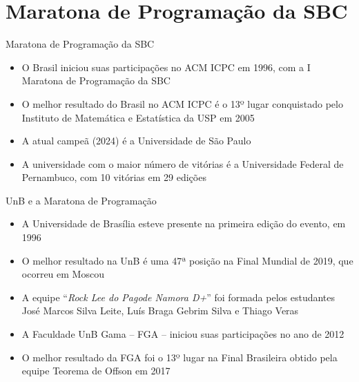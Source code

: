 \section{Maratona de Programação da SBC}

\begin{frame}[fragile]{Maratona de Programação da SBC}

    \begin{itemize}
        \item O Brasil iniciou suas participações no ACM ICPC em 1996, com a I Maratona de
            Programação da SBC
        \item O melhor resultado do Brasil no ACM ICPC é o 13º lugar conquistado pelo 
            Instituto de Matemática e Estatística da USP em 2005
        \item A atual campeã (2024) é a Universidade de São Paulo
        \item A universidade com o maior número de vitórias é a Universidade Federal de
            Pernambuco, com 10 vitórias em 29 edições
    \end{itemize}

\end{frame}

\begin{frame}[fragile]{UnB e a Maratona de Programação}

    \begin{itemize}
        \item A Universidade de Brasília esteve presente na primeira edição do evento, em 1996
        \item O melhor resultado na UnB é uma 47ª posição na Final Mundial de 2019, que ocorreu
            em Moscou

        \item A equipe ``\textit{Rock Lee do Pagode Namora D+}'' foi formada pelos estudantes José Marcos 
            Silva Leite, Luís Braga Gebrim Silva e Thiago Veras

        \item A Faculdade UnB Gama -- FGA -- iniciou suas participações no ano de 2012
        \item O melhor resultado da FGA foi o 13º lugar na Final Brasileira obtido pela equipe 
            Teorema de Offson em 2017
    \end{itemize}

\end{frame}
